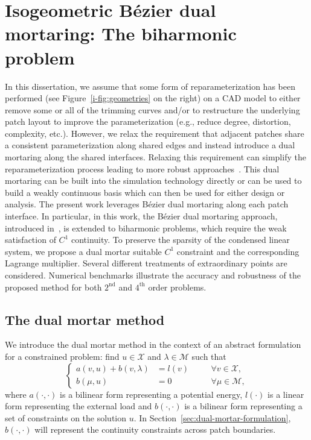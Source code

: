 \chapter{Isogeometric B\'ezier dual mortaring: The biharmonic problem}
\label{chp:chapter3}
\graphicspath{{figures/}{figures/chapter3/}}



In this dissertation, we assume that some form of reparameterization has been performed (see Figure~\ref{i-fig:geometries} on the right) on a CAD model to either remove some or all of the trimming curves and/or to restructure the underlying patch layout to improve the parameterization (e.g., reduce degree, distortion, complexity, etc.). However, we relax the requirement that adjacent patches share a consistent parameterization along shared edges and instead introduce a dual mortaring along the shared interfaces. Relaxing this requirement can simplify the reparameterization process leading to more robust approaches~\cite{xu2011parameterization}. This dual mortaring can be built into the simulation technology directly or can be used to build a weakly continuous basis which can then be used for either design or analysis. The present work leverages B\'ezier dual mortaring along each patch interface. In particular, in this work, the B\'ezier dual mortaring approach, introduced in~\cite{zou2018isogeometric}, is extended to biharmonic problems, which require the weak satisfaction of $C^1$ continuity. To preserve the sparsity of the condensed linear system, we propose a dual mortar suitable $C^1$ constraint and the corresponding Lagrange multiplier. Several different treatments of extraordinary points are considered. Numerical benchmarks illustrate the accuracy and robustness of the proposed method for both $2^\text{nd}$ and $4^\text{th}$ order problems.\par

\section{The dual mortar method}
\label{sec:dual-mortar-method}
We introduce the dual mortar method in the context of an abstract formulation for a constrained problem: find $u\in\mathcal{X}$ and $\lambda\in\mathcal{M}$ such that
\begin{equation}\label{eq:LM-form}
  \left\{\begin{alignedat}{2}
    a(v,u)+b(v,\lambda)&=l(v)\quad &&\forall{}v\in\mathcal{X},\\
    b(\mu,u)&=0\quad &&\forall{}\mu\in\mathcal{M},
  \end{alignedat}\right.
\end{equation}
where $a(\cdot,\cdot)$ is a bilinear form representing a potential energy, $l(\cdot)$ is a linear form representing the external load and $b(\cdot,\cdot)$ is a bilinear form representing a set of constraints on the solution $u$. In Section~\ref{sec:dual-mortar-formulation}, $b(\cdot,\cdot)$ will represent the continuity constraints across patch boundaries.

